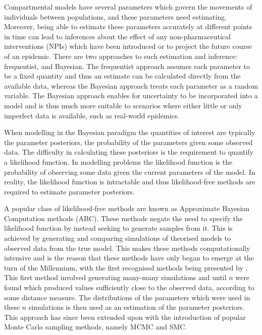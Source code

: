 \documentclass[11pt,a4paper]{article}
\theoremstyle{break}
\begin{document}
  \par Compartmental models have several parameters which govern the movements of individuals between populations, and these parameters need estimating. Moreover, being able to estimate these parameters accurately at different points in time can lead to inferences about the effect of any non-pharmaceutical interventions (NPIs) which have been introduced or to project the future course of an epidemic. There are two approaches to such estimation and inference: frequentist, and Bayesian. The frequentist approach assumes each parameter to be a fixed quantity and thus an estimate can be calculated directly from the available data, whereas the Bayesian approach treats each parameter as a random variable. The Bayesian approach enables for uncertainty to be incorporated into a model and is thus much more suitable to scenarios where either little or only imperfect data is available, such as real-world epidemics.

  \par When modelling in the Bayesian paradigm the quantities of interest are typically the parameter posteriors, the probability of the parameters given some observed data. The difficulty in calculating these posteriors is the requirement to quantify a likelihood function. In modelling problems the likelihood function is the probability of observing some data given the current parameters of the model. In reality, the likelihood function is intractable and thus likelihood-free methods are required to estimate parameter posteriors.

  \par A popular class of likelihood-free methods are known as Approximate Bayesian Computation methods (ABC). These methods negate the need to specify the likelihood function by instead seeking to generate samples from it. This is achieved by generating and comparing simulations of theorised models to observed data from the true model. This makes these methods computationally intensive and is the reason that these methods have only began to emerge at the turn of the Millennium, with the first recognised methods being presented by \cite[]{inferring_coalescence_times_from_dna_sequence_data}. This first method involved generating many-many simulations and until $n$ were found which produced values sufficiently close to the observed data, according to some distance measure. The distributions of the parameters which were used in these $n$ simulations is then used as an estimation of the parameter posteriors. This approach has since been extended upon with the introduction of popular Monte Carlo sampling methods, namely MCMC and SMC.
\end{document}
